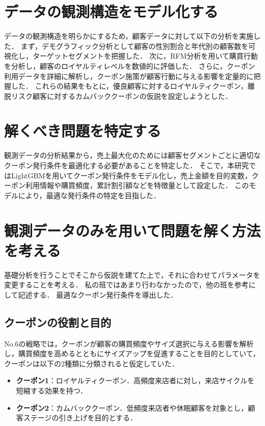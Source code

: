 \documentclass[titlepage,a4paper]{jsarticle}
\title{}
\author{本間 三暉}
\begin{document}
\maketitle
\section{データの観測構造をモデル化する}
データの観測構造を明らかにするため，顧客データに対して以下の分析を実施した．
まず，デモグラフィック分析として顧客の性別割合と年代別の顧客数を可視化し，ターゲットセグメントを把握した．
次に，RFM分析を用いて購買行動を分析し，顧客のロイヤルティレベルを数値的に評価した．
さらに，クーポン利用データを詳細に解析し，クーポン施策が顧客行動に与える影響を定量的に把握した．
これらの結果をもとに，優良顧客に対するロイヤルティクーポン，離脱リスク顧客に対するカムバッククーポンの仮説を設定しようとした．
\section{解くべき問題を特定する}
観測データの分析結果から，売上最大化のためには顧客セグメントごとに適切なクーポン発行条件を最適化する必要があることを特定した．
そこで，本研究ではLightGBMを用いてクーポン発行条件をモデル化し，売上金額を目的変数，クーポン利用情報や購買頻度，累計割引額などを特徴量として設定した．
このモデルにより，最適な発行条件の特定を目指した．
\section{観測データのみを用いて問題を解く方法を考える}%
基礎分析を行うことでそこから仮説を建てた上で，それに合わせてパラメータを変更することを考える．
私の班ではあまり行わなかったので，他の班を参考にして記述する．
最適なクーポン発行条件を導出した．

\subsection{クーポンの役割と目的}
No.6の戦略では，クーポンが顧客の購買頻度やサイズ選択に与える影響を解析し，購買頻度を高めるとともにサイズアップを促進することを目的としていて，クーポンは以下の2種類に分類されると仮定していた．
\begin{itemize}
  \item \textbf{クーポン1}：ロイヤルティクーポン．高頻度来店者に対し，来店サイクルを短縮する効果を持つ．
  \item \textbf{クーポン2}：カムバッククーポン．低頻度来店者や休眠顧客を対象とし，顧客ステージの引き上げを目的とする．
\end{itemize}
\end{document}
